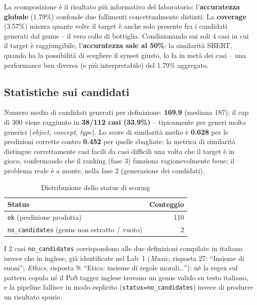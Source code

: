 \documentclass[12pt,a4paper]{article}
\begin{document}
La scomposizione \`e il risultato pi\`u informativo del laboratorio: l'\textbf{accuratezza globale} (1.79\%) confonde due fallimenti concettualmente distinti. La \textbf{coverage} (3.57\%) misura quante volte il target \`e anche solo presente fra i candidati generati dal genus -- il vero collo di bottiglia. Condizionando sui soli 4 casi in cui il target \`e raggiungibile, l'\textbf{accuratezza sale al 50\%}: la similarit\`a SBERT, quando ha la possibilit\`a di scegliere il synset giusto, lo fa in met\`a dei casi -- una performance ben diversa (e pi\`u interpretabile) del 1.79\% aggregato.

\subsection{Statistiche sui candidati}

Numero medio di candidati generati per definizione: \textbf{169.9} (mediana 187); il cap di 300 viene raggiunto in \textbf{38/112 casi (33.9\%)} -- tipicamente per generi molto generici (\textit{object}, \textit{concept}, \textit{type}). Lo score di similarit\`a medio \`e \textbf{0.628} per le predizioni corrette contro \textbf{0.452} per quelle sbagliate: la metrica di similarit\`a distingue correttamente casi facili da casi difficili una volta che il target \`e in gioco, confermando che il ranking (fase 3) funziona ragionevolmente bene; il problema reale \`e a monte, nella fase 2 (generazione dei candidati).

\begin{table}[H]
  \centering
  \caption{Distribuzione dello status di scoring}
  \begin{tabular}{lr}
    \toprule
    \textbf{Status} & \textbf{Conteggio} \\
    \midrule
    \texttt{ok} (predizione prodotta) & 110 \\
    \texttt{no\_candidates} (genus non estratto / vuoto) & 2 \\
    \bottomrule
  \end{tabular}
\end{table}

I 2 casi \texttt{no\_candidates} corrispondono alle due definizioni compilate in italiano invece che in inglese, gi\`a identificate nel Lab~1 (\textit{Music}, risposta 27: ``Insieme di suoni''; \textit{Ethics}, risposta 9: ``Etica: insieme di regole morali\ldots''): n\'e la regex sul pattern copula n\'e il PoS tagger inglese trovano un genus valido su testo italiano, e la pipeline fallisce in modo esplicito (\texttt{status=no\_candidates}) invece di produrre un risultato spurio.
\end{document}
